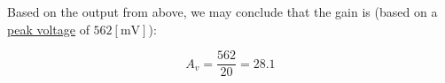 \begin{enumerate}
\begin{enumerate}
        Based on the output from above, we may conclude that the gain is (based on a \underline{peak voltage} of $562[\si{\milli\volt}]$):

        $$\boxed{A_v=\frac{562}{20}=28.1}$$

    \end{enumerate}

\end{enumerate}



